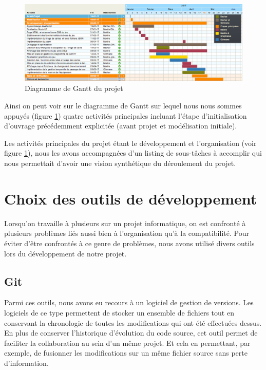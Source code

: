 \documentclass[12pt]{report}
\begin{document}
		\begin{figure}[h!]
    	\centering
	    \includegraphics[scale=0.4]{diagrammeGantt.jpg}
	    \caption{Diagramme de Gantt du projet}
	    \label{fig:diagGantt}
    \end{figure}

		\newpage
		Ainsi on peut voir sur le diagramme de Gantt sur lequel nous nous sommes appuyés (figure \ref{fig:diagGantt}) quatre activités principales incluant l’étape d’initialisation d’ouvrage précédemment explicitée (avant projet et modélisation initiale).

		Les activités principales du projet étant le développement et l'organisation (voir figure \ref{fig:diagGantt}), nous les avons accompagnées d’un listing de sous-tâches à accomplir qui nous permettait d’avoir une vision synthétique du déroulement du projet.

		\newpage

		\section{Choix des outils de développement}
		Lorsqu’on travaille à plusieurs sur un projet informatique, on est confronté à plusieurs problèmes liés aussi bien à l’organisation qu’à la compatibilité.
		Pour éviter d'être confrontés à ce genre de problèmes, nous avons utilisé divers outils lors du développement de notre projet.

			\subsection*{Git}
	 		Parmi ces outils, nous avons eu recours à un logiciel de gestion de versions. Les logiciels de ce type permettent  de stocker un ensemble de fichiers tout en conservant la chronologie de toutes les modifications qui ont été effectuées dessus.
	 		En plus de conserver l’historique d’évolution du code source, cet outil permet de faciliter la collaboration au sein d’un même projet. Et cela en permettant, par exemple, de fusionner les modifications sur un même fichier source sans perte d’information.
\end{document}
